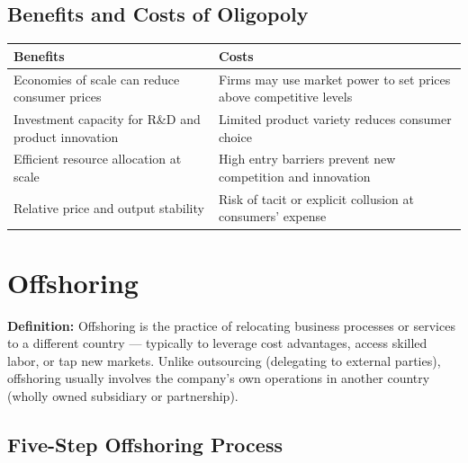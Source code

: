 \documentclass[11pt, letterpaper]{article}
\begin{document}
\subsection{Benefits and Costs of Oligopoly}

\begin{center}
\begin{tabular}{p{6.5cm} p{6.5cm}}
\toprule
\textbf{Benefits} & \textbf{Costs} \\
\midrule
Economies of scale can reduce consumer prices & Firms may use market power to set prices above competitive levels \\
Investment capacity for R\&D and product innovation & Limited product variety reduces consumer choice \\
Efficient resource allocation at scale & High entry barriers prevent new competition and innovation \\
Relative price and output stability & Risk of tacit or explicit collusion at consumers' expense \\
\bottomrule
\end{tabular}
\end{center}

\newpage

\section{Offshoring}

\begin{defbox}
\textbf{Definition:} Offshoring is the practice of relocating business processes or services to a different country --- typically to leverage cost advantages, access skilled labor, or tap new markets. Unlike outsourcing (delegating to external parties), offshoring usually involves the company's own operations in another country (wholly owned subsidiary or partnership).
\end{defbox}

\subsection{Five-Step Offshoring Process}
\end{document}
